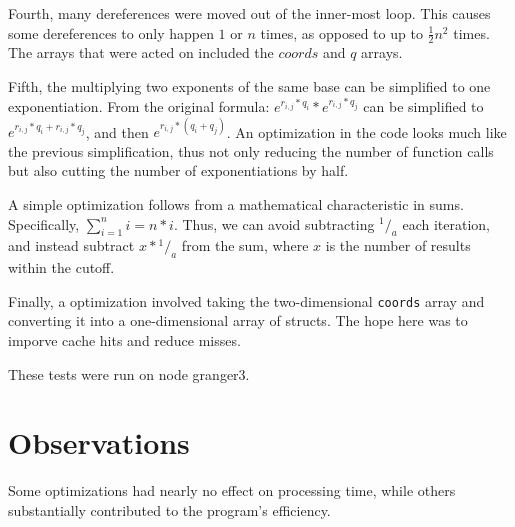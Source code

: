 \documentclass[12pt]{article}
\begin{document}
	Fourth, many dereferences were moved out of the inner-most loop.
	This causes some dereferences to only happen $1$ or $n$ times, as opposed to up to $\frac{1}{2}n^2$ times.
	The arrays that were acted on included the $coords$ and $q$ arrays.

	Fifth, the multiplying two exponents of the same base can be simplified to one exponentiation.
	From the original formula: $e^{r_{i,j}*q_i}*e^{r_{i,j}*q_j}$ can be simplified to $e^{r_{i,j}*q_i+r_{i,j}*q_j}$, and then $e^{r_{i,j}*(q_i+q_j)}$.
	An optimization in the code looks much like the previous simplification, 
	thus not only reducing the number of function calls but also cutting the number of exponentiations by half.

	A simple optimization follows from a mathematical characteristic in sums. 
	Specifically, $\displaystyle\sum_{i=1}^n{i} = n*i$.
	Thus, we can avoid subtracting $^1/_a$ each iteration, and instead subtract $x*{^1/_a}$ from the sum,
	where $x$ is the number of results within the cutoff.

	Finally, a optimization involved taking the two-dimensional \texttt{coords} array and converting it into a one-dimensional array of structs. 
	The hope here was to imporve cache hits and reduce misses.

	These tests were run on node granger3.




	\section{Observations}

	Some optimizations had nearly no effect on processing time, while others substantially contributed to the program's efficiency.
\end{document}
